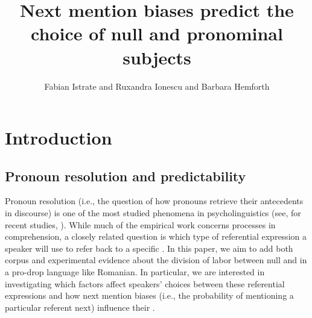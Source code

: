 \documentclass[output=paper,colorlinks,citecolor=brown]{langscibook}
\author{Fabian Istrate\orcid{}\affiliation{Université Paris Cité} and         Ruxandra Ionescu\orcid{}\affiliation{Université Paris Cité} and         Barbara Hemforth\orcid{}\affiliation{CNRS;Université Paris Cité}}
\title{Next mention biases predict the choice of null and pronominal subjects}
\begin{document}
\maketitle
\section{Introduction} \label{sect:intro:Istrate}
\subsection{Pronoun resolution and predictability}
Pronoun resolution (i.e., the question of how pronouns retrieve their antecedents in discourse) is one of the most studied phenomena in psycholinguistics (see, for recent studies, \citealt{holler2016empirical,  arnold2010speakers, kehler2019prominence, schulz2021corpus, colonna2012information}). While much of the empirical work concerns processes in comprehension, a closely related question is which type of referential expression a speaker will use to refer back to a specific  \citep{Fukumuraetal2022a}. In this paper, we aim to add both corpus and experimental evidence about the division of labor between null and  in a pro-drop language like Romanian. In particular, we are interested in investigating which factors affect speakers' choices between these referential expressions and how next mention biases (i.e., the probability of mentioning a particular referent next) influence their  \citep{arnold2001effect}.
\end{document}

